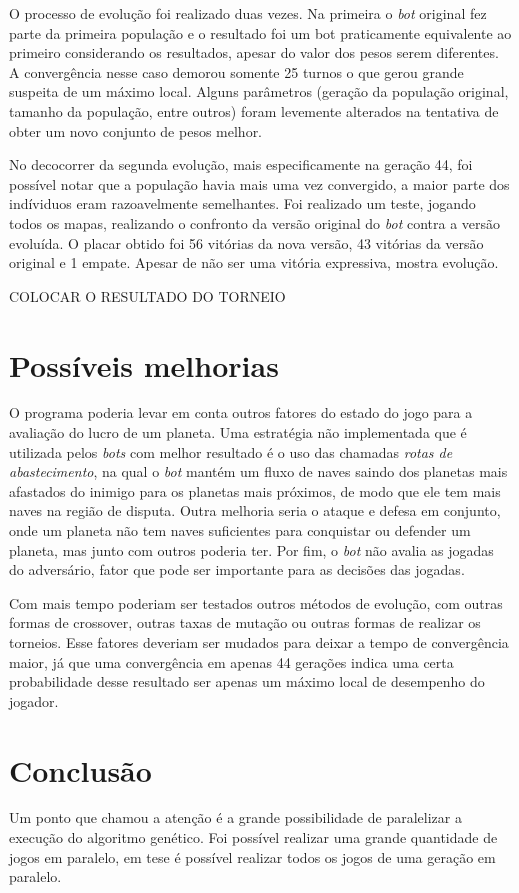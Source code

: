 \documentclass[a4paper,titlepage,11pt]{article}
\begin{document}
O processo de evolução foi realizado duas vezes. Na primeira o {\em bot} original fez parte da primeira população e o resultado foi um bot praticamente equivalente ao primeiro considerando os resultados, apesar do valor dos pesos serem diferentes. A convergência nesse caso demorou somente 25 turnos o que gerou grande suspeita de um máximo local. Alguns parâmetros (geração da população original, tamanho da população, entre outros) foram levemente alterados na tentativa de obter um novo conjunto de pesos melhor.

No decocorrer da segunda evolução, mais especificamente na geração 44, foi possível notar que a população havia mais uma vez convergido, a maior parte dos indíviduos eram razoavelmente semelhantes. Foi realizado um teste, jogando todos os mapas, realizando o confronto da versão original do {\em bot} contra a versão evoluída. O placar obtido foi 56 vitórias da nova versão, 43 vitórias da versão original e 1 empate. Apesar de não ser uma vitória expressiva, mostra evolução.

COLOCAR O RESULTADO DO TORNEIO

\section{Possíveis melhorias}
O programa poderia levar em conta outros fatores do estado do jogo para a avaliação do lucro de um planeta. Uma estratégia não implementada que é utilizada pelos {\em bots} com melhor resultado é o uso das chamadas {\em rotas de abastecimento}, na qual o {\em bot} mantém um fluxo de naves saindo dos planetas mais afastados do inimigo para os planetas mais próximos, de modo que ele tem mais naves na região de disputa. Outra melhoria seria o ataque e defesa em conjunto, onde um planeta não tem naves suficientes para conquistar ou defender um planeta, mas junto com outros poderia ter. Por fim, o {\em bot} não avalia as jogadas do adversário, fator que pode ser importante para as decisões das jogadas.

Com mais tempo poderiam ser testados outros métodos de evolução, com outras formas de crossover, outras taxas de mutação ou outras formas de realizar os torneios. Esse fatores deveriam ser mudados para deixar a tempo de convergência maior, já que uma convergência em apenas 44 gerações indica uma certa probabilidade desse resultado ser apenas um máximo local de desempenho do jogador.

\section{Conclusão}
Um ponto que chamou a atenção é a grande possibilidade de paralelizar a execução do algoritmo genético. Foi possível realizar uma grande quantidade de jogos em paralelo, em tese é possível realizar todos os jogos de uma geração em paralelo. 
\end{document}
